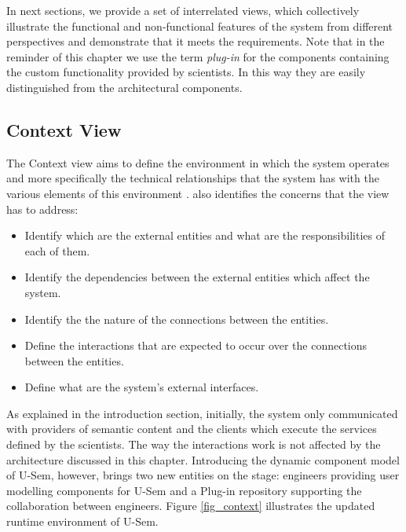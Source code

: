 In next sections, we provide a set of interrelated views, which collectively illustrate the functional and non-functional features of the system from different perspectives and demonstrate that it meets the requirements. Note that in the reminder of this chapter we use the term \textit{plug-in} for the components containing the custom functionality provided by scientists. In this way they are easily distinguished from the architectural components. 

\subsection{Context View}

The Context view aims to define the environment in which the system operates and more specifically the technical relationships that the system has with the various elements of this environment \cite{Woods}. \cite{Woods} also identifies the concerns that the view has to address:

\begin{itemize}
	\item Identify which are the external entities and what are the responsibilities of each of them.
	\item Identify the dependencies between the external entities which affect the system.
	\item Identify the the nature of the connections between the entities.
	\item Define the interactions that are expected to occur over the connections between the entities.
	\item Define what are the system's external interfaces.
\end{itemize}


As explained in the introduction section, initially, the system only communicated with providers of semantic content and the clients which execute the services defined by the scientists. The way the interactions work is not affected by the architecture discussed in this chapter. Introducing the dynamic component model of U-Sem, however, brings two new entities on the stage: engineers providing user modelling components for U-Sem and a Plug-in repository supporting the collaboration between engineers. Figure \ref{fig_context} illustrates the updated runtime environment of U-Sem.


